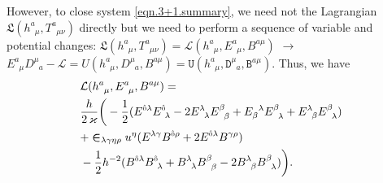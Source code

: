 \documentclass[
10pt, %
a4paper, %
oneside, %
twocolumn,
headinclude,footinclude, %
BCOR5mm, %
]{scrartcl}
\newcommand{\sA}{\mathsmaller A}
\newcommand{\tetrsymbol}{h}
\newcommand{\itetrsymbol}{\eta}
\newcommand{\itetr}[2]{\itetrsymbol^{#1}_{\phantom{#1}#2}}
\newcommand{\tetr}[2]{\tetrsymbol^{#1}_{\phantom{#1}#2}}
\newcommand{\detTetr}{\tetrsymbol}
\newcommand{\Tors}[2]{T^{#1}_{\phantom{#1}#2}}
\newcommand{\ET}[2]{E^{#1}_{\phantom{#1}#2}}	%
\newcommand{\ETmix}[2]{E^{#1}_{#2}}	%
\newcommand{\Dm}[2]{D_{\phantom{#2}#1}^{#2}}	%
\newcommand{\aD}[2]{\mathcal{D}_{\phantom{#2}#1}^{#2}}	%
\newcommand{\Dfin}[2]{\mathtt{D}_{\phantom{#2}#1}^{#2}}	%
\newcommand{\Ufin}{\mathtt{U}}
\newcommand{\BT}[2]{B^{#1#2}}	%
\newcommand{\BTmix}[2]{B^{#1}_{#2}}	%
\newcommand{\Bm}[2]{B^{#1#2}}	%
\newcommand{\aB}[2]{\mathcal{B}^{#1#2}}	%
\newcommand{\Bfin}[2]{\mathtt{B}^{#1#2}}	%
\newcommand{\Lagtors}{\mathfrak{L}}%
\newcommand{\LagBE}{\mathcal{L}}%
\newcommand{\Um}{U}%
\newcommand{\LCsymb}{\bm{\in}}    %
\newcommand{\indalg}[1]{\hat{\mathsmaller{#1}}}
\begin{document}
	
	However, to close system \eqref{eqn.3+1.summary}, we need not the Lagrangian $ 
	\Lagtors(\tetr{a}{\mu},\Tors{a}{\mu\nu})  $ directly but we need to perform a sequence of 
	variable 
	and potential changes: $ \Lagtors(\tetr{a}{\mu},\Tors{a}{\mu\nu}) = 
	\LagBE(\tetr{a}{\mu},\ET{a}{\mu},\BT{a}{\mu}) $ $ \longrightarrow $ $ \ET{a}{\mu} 
	\Dm{a}{\mu} - \LagBE = 
	\Um(\tetr{a}{\mu},\Dm{a}{\mu},\Bm{a}{\mu}) = 
	\Ufin(\tetr{a}{\mu},\Dfin{a}{\mu},\Bfin{a}{\mu}) $. 
	Thus, we have
	\begin{align}\label{eqn.Tscal.EB}
		&\LagBE(\tetr{a}{\mu},\ET{a}{\mu},\BT{a}{\mu}) = \nonumber\\
		&\frac{\detTetr}{2 \, \varkappa}
		\bigg(
		- \frac12(\ETmix{\indalg{0}\lambda}{}\ETmix{\indalg{0}}{\ \lambda} -  
		2\ETmix{\lambda}{\ \,\lambda}\ETmix{\beta}{\ \,\beta} +
		\ETmix{\ \,\lambda}{\beta} \ETmix{\beta}{\ \,\lambda}  +
		\ETmix{\lambda}{\ \,\beta}\ETmix{\beta}{\ \,\lambda} )
		\nonumber
		\\
		& + \LCsymb_{\lambda\gamma\eta\rho} u^\eta 
		(\ETmix{\lambda\gamma}{}\BTmix{\indalg{0}\rho}{} + 2 
		\ET{\indalg{0}\lambda}{}\BTmix{\gamma\rho}{})
		\nonumber
		\\
		&- \frac12 h^{-2} ( \BTmix{\indalg{0}\lambda}{}\BTmix{\indalg{0}}{\ \lambda}
		+ \BTmix{\lambda}{\ \,\lambda}\BTmix{\beta}{\ \,\beta}
		- 2\BTmix{\lambda}{\ \,\beta}\BTmix{\beta}{\ \,\lambda}
		)
		\bigg).
	\end{align}
	
\end{document}
